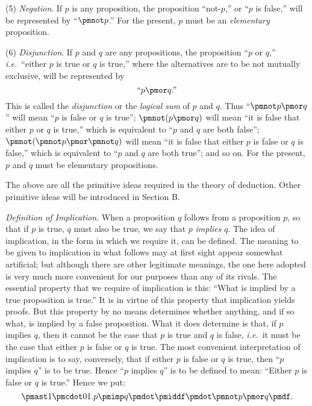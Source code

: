 \documentclass[letterpaper,12pt,openany,leqno]{book}
\newcommand{\pagefirst}[1]{\marginnote[\boxed{\text{#1}}]{\boxed{\text{#1}}}}
\begin{document}
(5) \textit{Negation}. If $p$ is any proposition, the proposition ``not-$p$,'' or ``$p$ is false,'' will be represented by ``$\pmnot p$.'' For the present, $p$ must be an \textit{elementary} proposition.

(6) \textit{Disjunction}. If $p$ and $q$ are any propositions, the proposition ``$p$ or $q$,'' \textit{i.e.}\ ``either $p$ is true or $q$ is true,'' where the alternatives are to be not mutually exclusive, will be represented by
\[
	\text{``}p \pmor q\text{.''}
\]
This is called the \textit{disjunction} or the \textit{logical sum} of $p$ and $q$. Thus ``$\pmnot p \pmor q$'' will mean ``$p$ is false or $q$ is true''; $\pmnot(p \pmor q)$ will mean ``it is false that either $p$ or $q$ is true,'' which is equivalent to ``$p$ and $q$ are both false''; \pagefirst{98} $\pmnot(\pmnot p \pmor \pmnot q)$ will mean ``it is false that either $p$ is false or $q$ is false,'' which is equivalent to ``$p$ and $q$ are both true''; and so on. For the present, $p$ and $q$ must be elementary propositions.

The above are all the primitive ideas required in the theory of deduction. Other primitive ideas will be introduced in Section B.

\textit{Definition of Implication}. When a proposition $q$ follows from a proposition $p$, so that if $p$ is true, $q$ must also be true, we say that $p$ \textit{implies} $q$. The idea of implication, in the form in which we require it, can be defined. The meaning to be given to implication in what follows may at first sight appear somewhat artificial; but although there are other legitimate meanings, the one here adopted is very much more convenient for our purposes than any of its rivals. The essential property that we require of implication is this: ``What is implied by a true proposition is true.'' It is in virtue of this property that implication yields proofs. But this property by no means determines whether anything, and if so what, is implied by a false proposition. What it does determine is that, if $p$ implies $q$, then it cannot be the case that $p$ is true and $q$ is false, \textit{i.e.}\ it must be the case that either $p$ is false or $q$ is true. The most convenient interpretation of implication is to say, conversely, that if either $p$ is false or $q$ is true, then ``$p$ implies $q$'' is to be true. Hence ``$p$ implies $q$'' is to be defined to mean: ``Either $p$ is false or $q$ is true.'' Hence we put:
\[
	\pmast1\pmcdot01\text{.} p \pmimp q \pmdot \pmiddf \pmdot \pmnot p \pmor q \pmdf.
\]
\end{document}
